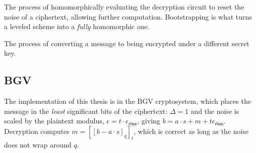 \begin{definition}[Bootstrapping]
    The process of homomorphically evaluating the decryption circuit to reset the noise of a ciphertext, allowing further computation. Bootstrapping is what turns a leveled scheme into a \textit{fully} homomorphic one.
\end{definition}

\begin{definition}[Keyswitching]
    The process of converting a message to being encrypted under a different secret key.
\end{definition}

\subsection{BGV}
The implementation of this thesis is in the BGV cryptosystem, which places the message in the \textit{least} significant bits of the ciphertext: $\Delta = 1$ and the noise is scaled by the plaintext modulus, $\epsilon = t\cdot \epsilon_{\mathsf{rlwe}}$, giving $b = a\cdot s + m + t\epsilon_{\mathsf{rlwe}}$. Decryption computes $m = \left[[b - a\cdot s]_q\right]_t$, which is correct as long as the noise does not wrap around $q$.

\newpage